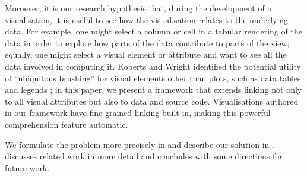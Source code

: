 Moroever, it is our research hypothesis that, during the development of a
visualisation, it is useful to see how the visualisation relates to the
underlying data. For example, one might select a column or cell in a tabular
rendering of the data in order to explore how parts of the data contribute to
parts of the view; equally, one might select a visual element or attribute and
want to see all the data involved in computing it. Roberts and Wright identified
the potential utility of ``ubiquitous brushing'' for visual elements other than
plots, such as data tables and legends \cite{roberts06}; in this paper, we
present a framework that extends linking not only to all visual attributes but
also to data and source code. Visualisations authored in our framework have
fine-grained linking built in, making this powerful comprehension feature
automatic.

We formulate the problem more precisely in  and
describe our solution in .  discusses
related work in more detail and  concludes with some
directions for future work.
